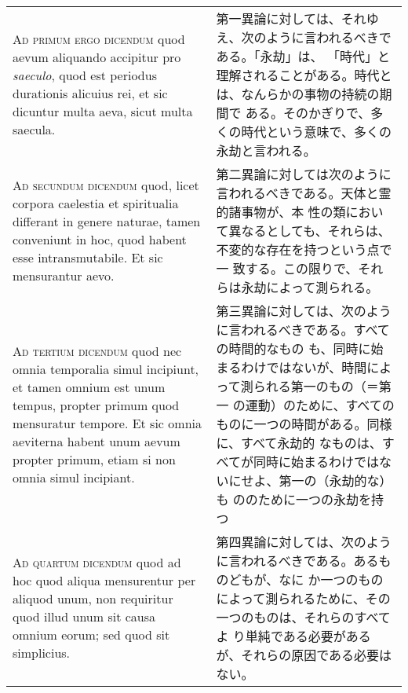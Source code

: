 \documentclass[10pt]{jsarticle} %
\begin{document}
\begin{longtable}{p{21em}p{21em}}
\\


{\scshape Ad primum ergo dicendum} quod aevum aliquando accipitur pro {\itshape saeculo}, quod
est periodus durationis alicuius rei, et sic dicuntur multa aeva, sicut
multa saecula.

&

第一異論に対しては、それゆえ、次のように言われるべきである。「永劫」は、
「時代」と理解されることがある。時代とは、なんらかの事物の持続の期間で
ある。そのかぎりで、多くの時代という意味で、多くの永劫と言われる。

\\

{\scshape Ad secundum dicendum} quod, licet corpora caelestia et spiritualia
differant in genere naturae, tamen conveniunt in hoc, quod habent esse
intransmutabile. Et sic mensurantur aevo.

&

第二異論に対しては次のように言われるべきである。天体と霊的諸事物が、本
性の類において異なるとしても、それらは、不変的な存在を持つという点で一
致する。この限りで、それらは永劫によって測られる。

\\

{\scshape Ad tertium dicendum} quod nec omnia temporalia simul incipiunt, et tamen
omnium est unum tempus, propter primum quod mensuratur tempore. Et sic
omnia aeviterna habent unum aevum propter primum, etiam si non omnia
simul incipiant.

&

第三異論に対しては、次のように言われるべきである。すべての時間的なもの
も、同時に始まるわけではないが、時間によって測られる第一のもの（＝第一
の運動）のために、すべてのものに一つの時間がある。同様に、すべて永劫的
なものは、すべてが同時に始まるわけではないにせよ、第一の（永劫的な）も
ののために一つの永劫を持つ


\\

{\scshape Ad quartum dicendum} quod ad hoc quod aliqua mensurentur per aliquod
unum, non requiritur quod illud unum sit causa omnium eorum; sed quod
sit simplicius.

&

第四異論に対しては、次のように言われるべきである。あるものどもが、なに
か一つのものによって測られるために、その一つのものは、それらのすべてよ
り単純である必要があるが、それらの原因である必要はない。


\end{longtable}
\end{document}
